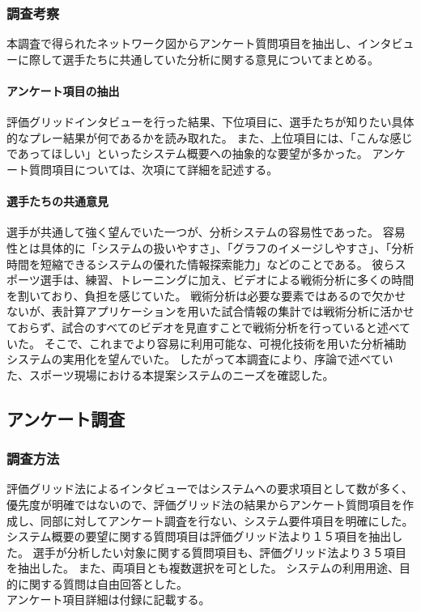 \documentclass[sotsuron]{kuee}
\begin{document}
			\subsubsection{調査考察}
				本調査で得られたネットワーク図からアンケート質問項目を抽出し、インタビューに際して選手たちに共通していた分析に関する意見についてまとめる。
				\paragraph{アンケート項目の抽出}
					評価グリッドインタビューを行った結果、下位項目に、選手たちが知りたい具体的なプレー結果が何であるかを読み取れた。
					また、上位項目には、「こんな感じであってほしい」といったシステム概要への抽象的な要望が多かった。
					アンケート質問項目については、次項にて詳細を記述する。
				\paragraph{選手たちの共通意見}
					選手が共通して強く望んでいた一つが、分析システムの容易性であった。
					容易性とは具体的に「システムの扱いやすさ」、「グラフのイメージしやすさ」、「分析時間を短縮できるシステムの優れた情報探索能力」などのことである。
					彼らスポーツ選手は、練習、トレーニングに加え、ビデオによる戦術分析に多くの時間を割いており、負担を感じていた。
					戦術分析は必要な要素ではあるので欠かせないが、表計算アプリケーションを用いた試合情報の集計では戦術分析に活かせておらず、試合のすべてのビデオを見直すことで戦術分析を行っていると述べていた。
					そこで、これまでより容易に利用可能な、可視化技術を用いた分析補助システムの実用化を望んでいた。
					したがって本調査により、序論で述べていた、スポーツ現場における本提案システムのニーズを確認した。
		\subsection{アンケート調査}
			\subsubsection{調査方法}
				評価グリッド法によるインタビューではシステムへの要求項目として数が多く、優先度が明確ではないので、評価グリッド法の結果からアンケート質問項目を作成し、同部に対してアンケート調査を行ない、システム要件項目を明確にした。
				\\システム概要の要望に関する質問項目は評価グリッド法より１５項目を抽出した。
				選手が分析したい対象に関する質問項目も、評価グリッド法より３５項目を抽出した。
				また、両項目とも複数選択を可とした。
				システムの利用用途、目的に関する質問は自由回答とした。
				\\アンケート項目詳細は付録に記載する。
\end{document}
